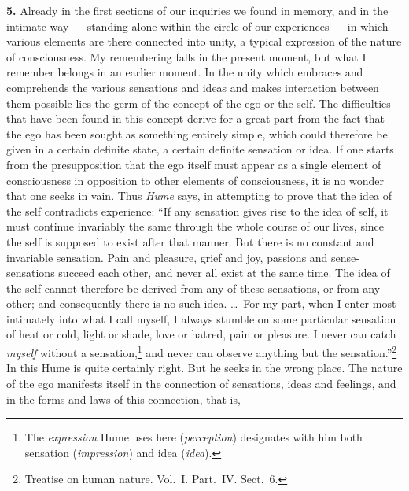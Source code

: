 \documentclass[12pt,a4paper]{book}
\newcommand{\opage}[1]{\marginnote{\footnotesize\textit{[#1]}}}
\begin{document}
\textbf{5.} Already in the first sections of our inquiries we found in
memory, and in the intimate way --- standing alone within the circle of
our experiences --- in which various elements are there connected into
unity, a typical expression of the nature of consciousness. My
remembering falls in the present moment, but what I remember belongs in
an earlier moment. In the unity which embraces and comprehends the various
sensations and ideas and makes interaction between them possible lies the
germ of the concept of the ego or the self. The difficulties that have
been found in this concept derive for a great part from the fact that the
ego has been sought as something entirely simple, which could therefore be
given in a certain definite state, a certain definite
\opage{166}sensation or idea. If one starts from the presupposition that
the ego itself must appear as a single element of consciousness in
opposition to other elements of consciousness, it is no wonder that one
seeks in vain. Thus \emph{Hume} says, in attempting to prove that the idea
of the self contradicts experience: ``If any sensation gives rise to the
idea of self, it must continue invariably the same through the whole
course of our lives, since the self is supposed to exist after that
manner. But there is no constant and invariable sensation. Pain and
pleasure, grief and joy, passions and sense-sensations succeed each other,
and never all exist at the same time. The idea of the self cannot
therefore be derived from any of these sensations, or from any other; and
consequently there is no such idea. \ldots\ For my part, when I enter most
intimately into what I call myself, I always stumble on some particular
sensation of heat or cold, light or shade, love or hatred, pain or
pleasure. I never can catch \emph{myself}
without a sensation,\footnote{The \emph{expression} Hume uses here
(\textit{perception}) designates with him both sensation
(\textit{impression}) and idea (\textit{idea}).} and never can observe
anything but the
sensation.''\footnote{Treatise on human nature. Vol.~I. Part.~IV.
Sect.~6.}
In this Hume is quite certainly right. But he seeks in the wrong place.
The nature of the ego manifests itself in the connection of sensations,
ideas and feelings, and in the forms and laws of this connection, that is,
\end{document}
